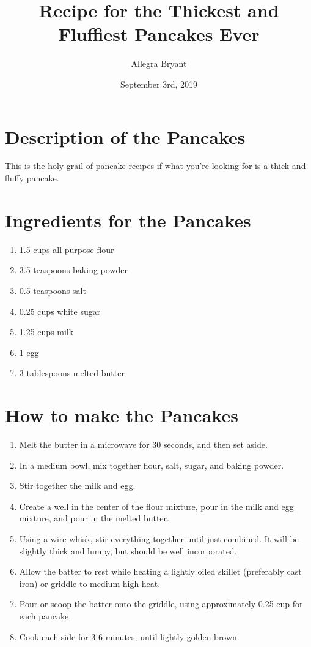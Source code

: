 \documentclass[12pt]{article}
\title{Recipe for the Thickest and Fluffiest Pancakes Ever}
\author{Allegra Bryant}
\date{September 3rd, 2019}
\begin{document}
\maketitle
\newpage
\section{Description of the Pancakes}
 This is the holy grail of pancake recipes if what you're looking for is a thick and fluffy pancake.  

\section{Ingredients for the Pancakes}
\begin{enumerate}
    \item 1.5 cups all-purpose flour
    \item 3.5 teaspoons baking powder
    \item 0.5 teaspoons salt
    \item 0.25 cups white sugar
    \item 1.25 cups milk
    \item 1 egg
    \item 3 tablespoons melted butter
\end{enumerate}

\section{How to make the Pancakes}
\begin{enumerate}
    \item Melt the butter in a microwave for 30 seconds, and then set aside.
    \item In a medium bowl, mix together flour, salt, sugar, and baking powder.
    \item Stir together the milk and egg.
    \item Create a well in the center of the flour mixture, pour in the milk and egg mixture, and pour in the melted butter.
    \item Using a wire whisk, stir everything together until just combined. It will be slightly thick and lumpy, but should be well incorporated. 
    \item Allow the batter to rest while heating a lightly oiled skillet (preferably cast iron) or griddle to medium high heat. 
    \item Pour or scoop the batter onto the griddle, using approximately 0.25 cup for each pancake. 
    \item Cook each side for 3-6 minutes, until lightly golden brown. 
\end{enumerate}
\end{document}
